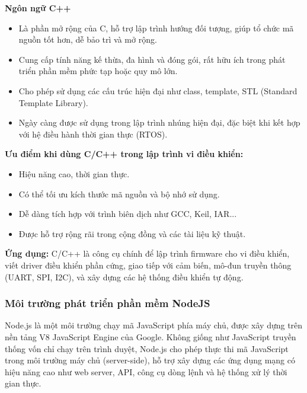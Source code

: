 \textbf{Ngôn ngữ C++}
\begin{itemize}
    \item Là phần mở rộng của C, hỗ trợ lập trình hướng đối tượng, giúp tổ chức mã nguồn tốt hơn, dễ bảo trì và mở rộng.
    \item Cung cấp tính năng kế thừa, đa hình và đóng gói, rất hữu ích trong phát triển phần mềm phức tạp hoặc quy mô lớn.
    \item Cho phép sử dụng các cấu trúc hiện đại như class, template, STL (Standard Template Library).
    \item Ngày càng được sử dụng trong lập trình nhúng hiện đại, đặc biệt khi kết hợp với hệ điều hành thời gian thực (RTOS).
\end{itemize}

\textbf{Ưu điểm khi dùng C/C++ trong lập trình vi điều khiển:}
\begin{itemize}
    \item Hiệu năng cao, thời gian thực.
    \item Có thể tối ưu kích thước mã nguồn và bộ nhớ sử dụng.
    \item Dễ dàng tích hợp với trình biên dịch như GCC, Keil, IAR...
    \item Được hỗ trợ rộng rãi trong cộng đồng và các tài liệu kỹ thuật.
\end{itemize}

\textbf{Ứng dụng:}  
C/C++ là công cụ chính để lập trình firmware cho vi điều khiển, viết driver điều khiển phần cứng, giao tiếp với cảm biến, mô-đun truyền thông (UART, SPI, I2C), và xây dựng các hệ thống điều khiển tự động.

\subsubsection{Môi trường phát triển phần mềm NodeJS}

Node.js\cite{nodejs_docs} là một môi trường chạy mã JavaScript phía máy chủ, được xây dựng trên nền tảng V8 JavaScript Engine của Google. Không giống như JavaScript truyền thống vốn chỉ chạy trên trình duyệt, Node.js cho phép thực thi mã JavaScript trong môi trường máy chủ (server-side), hỗ trợ xây dựng các ứng dụng mạng có hiệu năng cao như web server, API, công cụ dòng lệnh và hệ thống xử lý thời gian thực.

